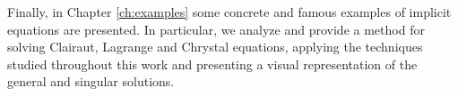 Finally, in Chapter \ref{ch:examples} some concrete and famous examples of implicit equations are presented. In particular, we analyze and provide a method for solving Clairaut, Lagrange and Chrystal equations, applying the techniques studied throughout this work and presenting a visual representation of the general and singular solutions.
